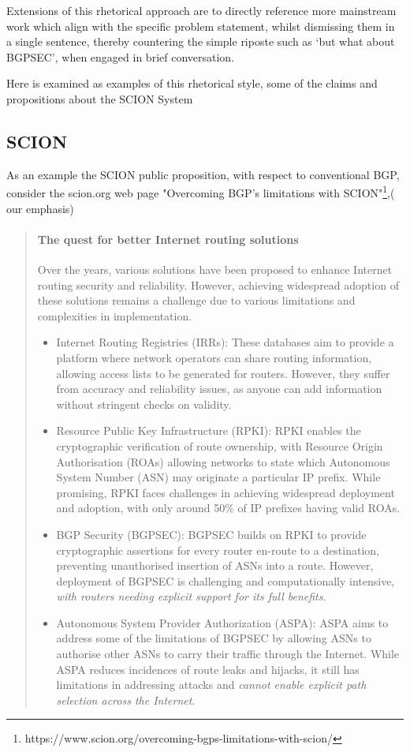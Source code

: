 Extensions of this rhetorical approach are to directly reference more mainstream work which align with the specific problem statement, whilst dismissing them in a single sentence, thereby countering the simple riposte such as `but what about BGPSEC', when engaged in brief conversation.

Here is examined as examples of this rhetorical style, some of the claims and propositions about the SCION System
\subsection{SCION}
As an example the SCION public proposition, with respect to conventional BGP, consider the scion.org web page "Overcoming BGP’s limitations with SCION"\footnote{https://www.scion.org/overcoming-bgps-limitations-with-scion/},( our emphasis)

\begin{quote}
    
\paragraph{The quest for better Internet routing solutions}
Over the years, various solutions have been proposed to enhance Internet routing security and reliability. However, achieving widespread adoption of these solutions remains a challenge due to various limitations and complexities in implementation.

\begin{itemize}
    \item Internet Routing Registries (IRRs): These databases aim to provide a platform where network operators can share routing information, allowing access lists to be generated for routers. However, they suffer from accuracy and reliability issues, as anyone can add information without stringent checks on validity.
    \item Resource Public Key Infrastructure (RPKI): RPKI enables the cryptographic verification of route ownership, with Resource Origin Authorisation (ROAs) allowing networks to state which Autonomous System Number (ASN) may originate a particular IP prefix. While promising, RPKI faces challenges in achieving widespread deployment and adoption, with only around 50\% of IP prefixes having valid ROAs.
    \item BGP Security (BGPSEC): BGPSEC builds on RPKI to provide cryptographic assertions for every router en-route to a destination, preventing unauthorised insertion of ASNs into a route. However, deployment of BGPSEC is challenging and computationally intensive, \emph{with routers needing explicit support for its full benefits}.
    \item Autonomous System Provider Authorization (ASPA): ASPA aims to address some of the limitations of BGPSEC by allowing ASNs to authorise other ASNs to carry their traffic through the Internet. While ASPA reduces incidences of route leaks and hijacks, it still has limitations in addressing attacks and \emph{cannot enable explicit path selection across the Internet}.
\end{itemize}
\end{quote}

